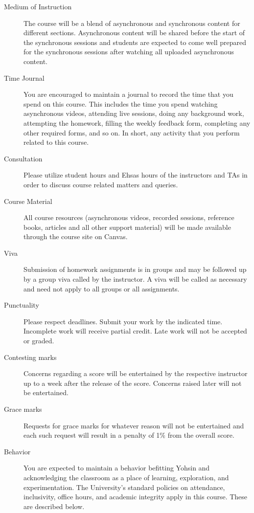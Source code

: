 \documentclass[a4paper]{article}
\begin{document}
\begin{description}
\item[Medium of Instruction] The course will be a blend of asynchronous and synchronous content for different sections. Asynchronous content will be shared before the start of the synchronous sessions and students are expected to come well prepared for the synchronous sessions after watching all uploaded asynchronous content.
\item[Time Journal] You are encouraged to maintain a journal to record the time that you spend on this course. This includes the time you spend watching asynchronous videos, attending live sessions, doing any background work, attempting the homework, filling the weekly feedback form, completing any other required forms, and so on. In short, any activity that you perform related to this course. 
\item[Consultation] Please utilize student hours and Ehsas hours of the instructors and TAs in order to discuss course related matters and queries.
\item[Course Material] All course resources (asynchronous videos, recorded sessions, reference books, articles and all other support material) will be made available through the course site on Canvas.
\item[Viva] Submission of homework assignments is in groups and may be followed up by a group viva called by the instructor. A viva will be called as necessary and need not apply to all groups or all assignments.
\item[Punctuality] Please respect deadlines. Submit your work by the indicated time. Incomplete work will receive partial credit. Late work will not be accepted or graded. 
\item[Contesting marks] Concerns regarding a score will be entertained by the respective instructor up to a week after the release of the score. Concerns raised later will not be entertained. 
\item[Grace marks] Requests for grace marks for whatever reason will not be entertained and each such request will result in a penalty of 1\% from the overall score. 
\item[Behavior] You are expected to maintain a behavior befitting Yohsin and acknowledging the classroom as a place of learning, exploration, and experimentation. The University’s standard policies on attendance, inclusivity, office hours, and academic integrity apply in this course. These are described below. 
\end{description}
\end{document}
